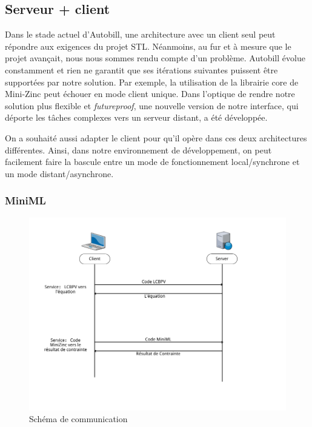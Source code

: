 \documentclass[12pt]{article}
\begin{document}
\hypertarget{serveur-client}{%
      \subsection{Serveur + client}\label{serveur-client}}

Dans le stade actuel d'Autobill, une architecture avec un client seul
peut répondre aux exigences du projet STL. Néanmoins, au fur et à mesure que le projet avançait, nous nous sommes rendu compte d'un problème. Autobill évolue constamment et rien ne garantit que ses itérations suivantes puissent
être supportées par notre solution. Par exemple, la utilisation de la librairie core de Mini-Zinc peut échouer en mode client unique. Dans l'optique de rendre notre solution plus flexible et \emph{futureproof}, une nouvelle version de notre interface, qui déporte les tâches complexes vers un serveur
distant, a été développée.

On a souhaité aussi adapter le client pour qu'il opère dans ces deux
architectures différentes. Ainsi, dans notre environnement de
développement, on peut facilement faire la bascule entre un mode de
fonctionnement local/synchrone et un mode distant/asynchrone.

\hypertarget{schuxe9ma-de-communication}{%
      \subsubsection{MiniML}\label{schuxe9ma-de-communication}}

\begin{figure}
      \centering
      \includegraphics{Figures/Communication.png}
      \caption{Schéma de communication}
\end{figure}
\end{document}
